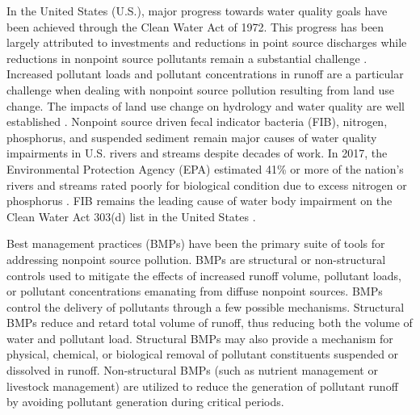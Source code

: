 \documentclass[utf8]{FrontiersinHarvard}
\begin{document}
In the United States (U.S.), major progress towards water quality goals
have been achieved through the Clean Water Act of 1972. This progress
has been largely attributed to investments and reductions in point
source discharges while reductions in nonpoint source pollutants remain
a substantial challenge
\citep{benhamLessonsLearnedTMDL2008, nationalresearchcouncilAssessingTMDLApproach2001, schrammTotalMaximumDaily2022}.
Increased pollutant loads and pollutant concentrations in runoff are a
particular challenge when dealing with nonpoint source pollution
resulting from land use change. The impacts of land use change on
hydrology and water quality are well established
\citep{allanLandscapesRiverscapesInfluence2004, carpenterNonpointPollutionSurface1998, bernhardtUnderstandingManagingMinimizing2008, careyEvaluatingNutrientImpacts2013, freemanImpactsUrbanizationDevelopment2019}.
Nonpoint source driven fecal indicator bacteria (FIB), nitrogen,
phosphorus, and suspended sediment remain major causes of water quality
impairments in U.S. rivers and streams despite decades of work. In 2017,
the Environmental Protection Agency (EPA) estimated 41\% or more of the
nation's rivers and streams rated poorly for biological condition due to
excess nitrogen or phosphorus \citep{epaNationalWaterQuality2017}. FIB
remains the leading cause of water body impairment on the Clean Water
Act 303(d) list in the United States
\citep{epaNationalWaterQuality2017}.

Best management practices (BMPs) have been the primary suite of tools
for addressing nonpoint source pollution. BMPs are structural or
non-structural controls used to mitigate the effects of increased runoff
volume, pollutant loads, or pollutant concentrations emanating from
diffuse nonpoint sources. BMPs control the delivery of pollutants
through a few possible mechanisms. Structural BMPs reduce and retard
total volume of runoff, thus reducing both the volume of water and
pollutant load. Structural BMPs may also provide a mechanism for
physical, chemical, or biological removal of pollutant constituents
suspended or dissolved in runoff. Non-structural BMPs (such as nutrient
management or livestock management) are utilized to reduce the
generation of pollutant runoff by avoiding pollutant generation during
critical periods.
\end{document}
